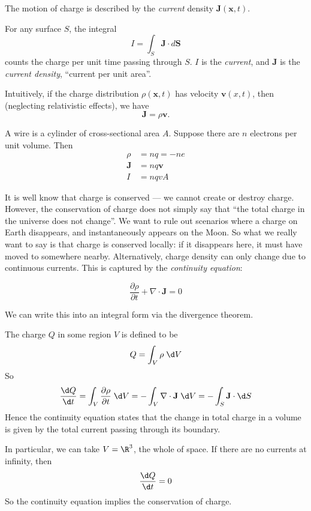 \documentclass[a4paper]{article}
\begin{document}
The motion of charge is described by the \emph{current} density $\mathbf{J}(\mathbf{x}, t)$.
\begin{defi}
For any surface $S$, the integral
\[
  I = \int_S \mathbf{J}\cdot d\mathbf{S}
\]
counts the charge per unit time passing through $S$. $I$ is the \emph{current}, and $\mathbf{J}$ is the \emph{current density}, ``current per unit area''.
\end{defi}
Intuitively, if the charge distribution $\rho (\mathbf{x}, t)$ has velocity $\mathbf{v}(x, t)$, then (neglecting relativistic effects), we have
\[
  \mathbf{J} = \rho \mathbf{v}.
\]

\begin{eg}
  A wire is a cylinder of cross-sectional area $A$. Suppose there are $n$ electrons per unit volume. Then
  \begin{align*}
    \rho &= nq = -ne\\
    \mathbf{J} &= nq\mathbf{v}\\
    I &= nqvA
  \end{align*}
\end{eg}

It is well know that charge is conserved --- we cannot create or destroy charge. However, the conservation of charge does not simply say that ``the total charge in the universe does not change''. We want to rule out scenarios where a charge on Earth disappears, and instantaneously appears on the Moon. So what we really want to say is that charge is conserved locally: if it disappears here, it must have moved to somewhere nearby. Alternatively, charge density can only change due to continuous currents. This is captured by the \emph{continuity equation}:
\begin{law}
  \[
    \frac{\partial\rho}{\partial t} + \nabla\cdot \mathbf{J} = 0
  \]
\end{law}
We can write this into an integral form via the divergence theorem.

The charge $Q$ in some region $V$ is defined to be
\[
  Q = \int_V \rho \;\d V
\]
So
\[
  \frac{\d Q}{\d t} = \int_V \frac{\partial\rho}{\partial t}\; \d V = -\int_V \nabla\cdot \mathbf{J}\; \d V = -\int_S \mathbf{J}\cdot \d S
\]
Hence the continuity equation states that the change in total charge in a volume is given by the total current passing through its boundary.

In particular, we can take $V = \R^3$, the whole of space. If there are no currents at infinity, then
\[
  \frac{\d Q}{\d t} = 0
\]
So the continuity equation implies the conservation of charge.
\end{document}
